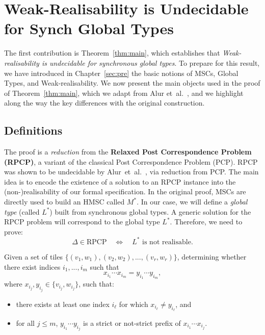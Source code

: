 \chapter{Weak-Realisability is Undecidable for Synch Global Types}\label{sec:proof}

The first contribution is Theorem~\ref{thm:main}, 
which establishes that \emph{Weak-realisability is undecidable for 
synchronous global types}. To prepare for this result, we have introduced 
in Chapter~\ref{sec:pre} the basic notions of MSCs, Global Types, and 
Weak-realisability.  
We now present the main objects used in the proof of 
Theorem~\ref{thm:main}, which we adapt from 
Alur et~al.~\cite{alur2005realizability}, and we highlight along the way 
the key differences with the original construction.

\section{Definitions}
The proof is a \emph{reduction} from the
\textbf{Relaxed Post Correspondence Problem (RPCP)}, a variant of
the classical Post Correspondence Problem (PCP). 
RPCP was shown to be undecidable by
Alur~et~al.~\cite{alur2005realizability}, via reduction from PCP.
The main idea is to encode the existence of a
solution to an RPCP instance into the (non-)realisability of our formal
specification. In the original proof, MSCs are directly used to build an
HMSC called $M^*$. In our case, we will define a
\emph{global type} (called $L^*$) built from synchronous global types.
A generic solution for the RPCP problem will correspond to the global
type $L^*$. Therefore, we need to prove:
$$
\Delta \in \text{RPCP} \quad\iff\quad L^* \text{ is not realisable}.
$$

\bigskip

\begin{definition}
	Given a set of tiles $\{(v_1, w_1), (v_2, w_2), ..., (v_r, w_r)\}$, 
	determining whether there exist indices $i_1, ..., i_m$ such that
	$$x_{i_1}\cdots x_{i_m} = y_{i_1}\cdots y_{i_m},$$
	where $x_{i_j}, y_{i_j} \in \{v_{i_j}, w_{i_j}\}$, such that:
	\begin{itemize}
		\item there exists at least one index $i_\ell$ for which $x_{i_\ell}\neq y_{i_\ell}$, and
		\item for all $j \leq m$, $y_{i_1}\cdots y_{i_j}$ is a strict or 
		not-strict prefix of $x_{i_1}\cdots x_{i_j}$.
	\end{itemize}
\end{definition}

